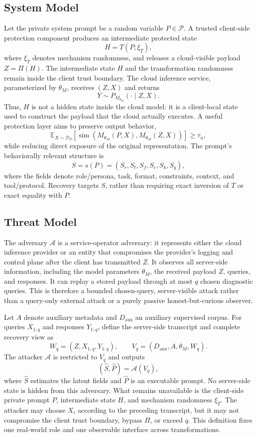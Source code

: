 \documentclass[letterpaper]{article} %
\begin{document}
\subsection{System Model}

Let the private system prompt be a random variable \(P\in\mathcal{P}\).  A trusted client-side protection component produces an intermediate protected state
\[
H=T(P;\xi_T),
\]
where \(\xi_T\) denotes mechanism randomness, and releases a cloud-visible payload \(Z=\Pi(H)\).  The intermediate state \(H\) and the transformation randomness remain inside the client trust boundary.  The cloud inference service, parameterized by \(\theta_M\), receives \((Z,X)\) and returns
\[
Y\sim P_{M_{\theta_M}}(\cdot\mid Z,X).
\]
Thus, \(H\) is not a hidden state inside the cloud model: it is a client-local state used to construct the payload that the cloud actually executes.  A useful protection layer aims to preserve output behavior,
\[
\mathbb{E}_{X\sim\mathcal{D}_P}[\operatorname{sim}(M_{\theta_M}(P,X),M_{\theta_M}(Z,X))]\geq\tau_u,
\]
while reducing direct exposure of the original representation.  The prompt's behaviorally relevant structure is
\[
S=s(P)=(S_r,S_t,S_f,S_c,S_k,S_q),
\]
where the fields denote role/persona, task, format, constraints, context, and tool/protocol.  Recovery targets \(S\), rather than requiring exact inversion of \(T\) or exact equality with \(P\).

\subsection{Threat Model}

The adversary \(\mathcal{A}\) is a service-operator adversary: it represents either the cloud inference provider or an entity that compromises the provider's logging and control plane after the client has transmitted \(Z\).  It observes all server-side information, including the model parameters \(\theta_M\), the received payload \(Z\), queries, and responses.  It can replay a stored payload through at most \(q\) chosen diagnostic queries.  This is therefore a bounded chosen-query, server-visible attack rather than a query-only external attack or a purely passive honest-but-curious observer.

Let \(A\) denote auxiliary metadata and \(D_{\mathrm{aux}}\) an auxiliary supervised corpus.  For queries \(X_{1:q}\) and responses \(Y_{1:q}\), define the server-side transcript and complete recovery view as
\[
W_q=(Z,X_{1:q},Y_{1:q}), \qquad V_q=(D_{\mathrm{aux}},A,\theta_M,W_q).
\]
The attacker \(\mathcal{A}\) is restricted to \(V_q\) and outputs
\[
(\hat{S},\hat{P})=\mathcal{A}(V_q),
\]
where \(\hat{S}\) estimates the latent fields and \(\hat{P}\) is an executable prompt.  No server-side state is hidden from this adversary.  What remains unavailable is the client-side private prompt \(P\), intermediate state \(H\), and mechanism randomness \(\xi_T\).  The attacker may choose \(X_i\) according to the preceding transcript, but it may not compromise the client trust boundary, bypass \(\Pi\), or exceed \(q\).  This definition fixes one real-world role and one observable interface across transformations.
\end{document}
